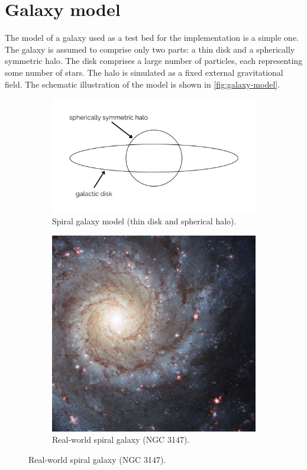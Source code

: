 \section{Galaxy model}\label{sec:galaxy-model}
The model of a galaxy used as a test bed for the implementation is a simple one.
The galaxy is assumed to comprise only two parts: a thin disk and a spherically symmetric halo.
The disk comprises a large number of particles, each representing some number of stars.
The halo is simulated as a fixed external gravitational field.
The schematic illustration of the model is shown in \autoref{fig:galaxy-model}.
\begin{figure}[htp]
    \centering
    \begin{subfigure}[t]{0.45\textwidth}
        \centering
        \includegraphics[scale=0.12]{chapters/test-models/img/galaxy-model.png}
        \caption{Spiral galaxy model (thin disk and spherical halo).}
        \label{fig:galaxy-model}
    \end{subfigure}
    \hfill
    \begin{subfigure}[t]{0.45\textwidth}
        \centering
        \includegraphics[scale=0.2]{chapters/test-models/img/ngc_628.jpg}
        \caption{Real-world spiral galaxy (NGC 3147).}
        \label{fig:ngc-628}
    \end{subfigure}


\end{figure}

